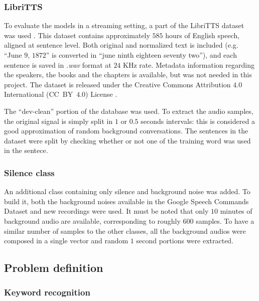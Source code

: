 \subsubsection{LibriTTS}

To evaluate the models in a streaming setting, a part of the LibriTTS dataset
was used \cite{zen2019libritts}. This dataset contains approximately $585$
hours of English speech, aligned at sentence level.
%
Both original and normalized text is included (e.g. ``June $9$, $1872$'' is
converted in ``june ninth eighteen seventy two''), and each sentence is saved
in \textit{.wav} format at $24$ KHz rate.
%
Metadata information regarding the speakers, the books and the chapters is
available, but was not needed in this project. The dataset is released under
the Creative Commons Attribution $4.0$ International (CC~BY~$4.0$) License
\cite{ccby4}.

The ``dev-clean'' portion of the database was used.
To extract the audio samples, the original signal is simply split in $1$ or
$0.5$ seconds intervals: this is considered a good approximation of random
background conversations.
The sentences in the dataset were split by checking whether or not
one of the training word was used in the sentece.


\subsubsection{Silence class}

An additional class containing only silence and background noise was added. To
build it, both the background noises available in the Google Speech Commands
Dataset and new recordings were used.
%
It must be noted that only $10$ minutes of background audio are available,
corresponding to roughly $600$ samples.
%
To have a similar number of samples to the other classes, all the background
audios were composed in a single vector and random $1$ second portions were
extracted.

\subsection{Problem definition}

\subsubsection{Keyword recognition}

